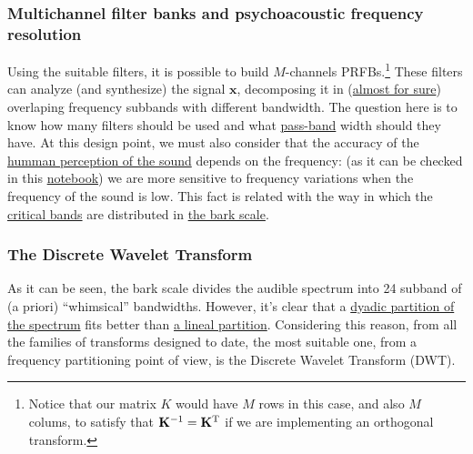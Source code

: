 \subsubsection{Multichannel filter banks and psychoacoustic frequency resolution}

Using the suitable filters, it is possible to build $M$-channels
PRFBs.\footnote{Notice that our matrix $K$ would have $M$ rows in this
  case, and also $M$ colums, to satisfy that
  ${\mathbf K}^{-1}={\mathbf K}^{\text T}$ if we are implementing an
  orthogonal transform.}  These filters can analyze (and synthesize)
the signal ${\mathbf x}$, decomposing it in
(\href{https://en.wikipedia.org/wiki/Low-pass_filter#Ideal_and_real_filters}{almost
  for sure}) overlaping frequency subbands with different
bandwidth. The question here is to know how many filters should be
used and what
\href{https://en.wikipedia.org/wiki/Band-pass_filter}{pass-band} width
should they have. At this design point, we must also consider that the
accuracy of the
\href{https://en.wikipedia.org/wiki/Psychoacoustics}{humman perception
  of the sound} depends on the frequency: (as it can be checked in
this
\href{https://github.com/Tecnologias-multimedia/intercom/blob/master/docs/frequency_resolution.ipynb}{notebook})
we are more sensitive to frequency variations when the frequency of
the sound is low. This fact is related with the way in which the
\href{https://en.wikipedia.org/wiki/Critical_band}{critical bands} are
distributed in \href{https://en.wikipedia.org/wiki/Bark_scale}{the
  bark scale}.


\subsubsection{The Discrete Wavelet Transform}

As it can be seen, the bark scale divides the audible spectrum into 24
subband of (a priori) ``whimsical'' bandwidths. However, it's clear
that a \href{https://en.wikipedia.org/wiki/Octave_band}{dyadic
  partition of the spectrum} fits better than
\href{https://en.wikipedia.org/wiki/Wavelet_transform#Principle}{a
  lineal partition}. Considering this reason, from all the families of
transforms designed to date, the most suitable one, from a frequency
partitioning point of view, is the Discrete Wavelet Transform (DWT).

